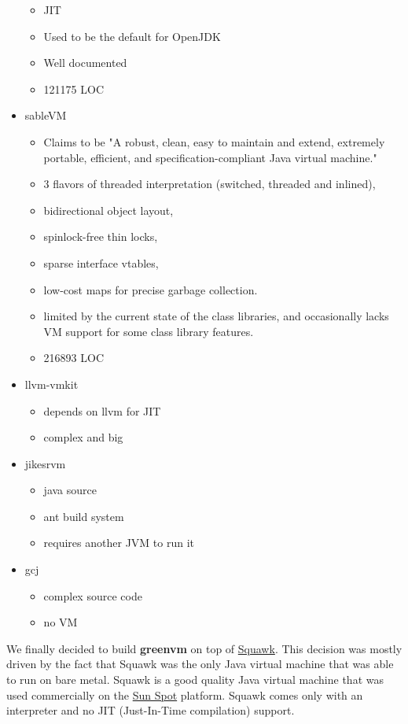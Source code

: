 \documentclass[
a4paper,
12pt,
]{report}
\newcommand{\gvm}{{\fontfamily{fco}\selectfont\textbf{\color{g}green\color{v}vm}}\xspace}
\newcommand{\java}{Java\texttrademark\xspace}
\begin{document}
\begin{itemize}
\begin{itemize}
  \item JIT
  \item Used to be the default for OpenJDK
  \item Well documented
  \item 121175 LOC
  \end{itemize}
\item sableVM
  \begin{itemize}
  \item Claims to be "A robust, clean, easy to maintain and extend,
     extremely portable, efficient, and specification-compliant Java
     virtual machine."
  \item 3 flavors of threaded interpretation (switched, threaded and
     inlined),
  \item bidirectional object layout,
  \item spinlock-free thin locks,
  \item sparse interface vtables,
  \item low-cost maps for precise garbage collection.
  \item limited by the current state of the class libraries, and
    occasionally lacks VM support for some class library features.
  \item 216893 LOC
  \end{itemize}
\item llvm-vmkit
  \begin{itemize}
  \item depends on llvm for JIT
  \item complex and big
  \end{itemize}
\item jikesrvm
  \begin{itemize}
  \item java source
  \item ant build system
  \item requires another JVM to run it
  \end{itemize}
\item gcj
  \begin{itemize}
  \item complex source code
  \item no VM
  \end{itemize}
\end{itemize}


We finally decided to build \gvm on top of
\href{https://java.net/projects/squawk/pages/SquawkDevelopment}{Squawk}.
This decision was mostly driven by the fact that Squawk was the only
\java virtual machine that was able to run on bare metal.  Squawk is a
good quality \java virtual machine that was used commercially on the
\href{http://www.sunspotworld.com/}{Sun Spot} platform.  Squawk comes
only with an interpreter and no JIT (Just-In-Time compilation) support.
\end{document}
